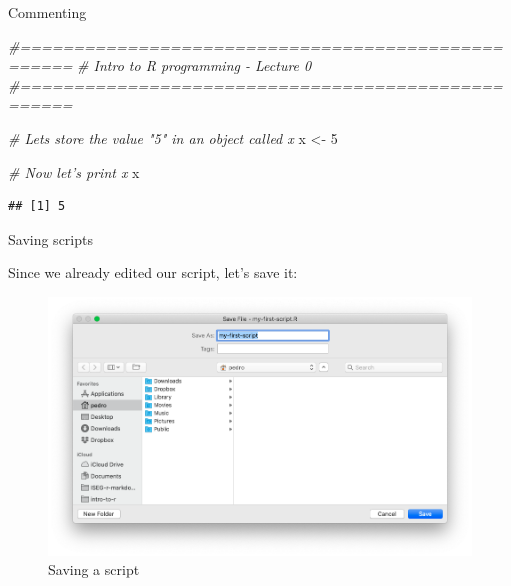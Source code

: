 \documentclass[ignorenonframetext,]{beamer}
\newenvironment{Shaded}{\begin{snugshade}}{\end{snugshade}}
\newcommand{\CommentTok}[1]{\textcolor[rgb]{0.56,0.35,0.01}{\textit{#1}}}
\newcommand{\DecValTok}[1]{\textcolor[rgb]{0.00,0.00,0.81}{#1}}
\newcommand{\NormalTok}[1]{#1}
\newcommand{\StringTok}[1]{\textcolor[rgb]{0.31,0.60,0.02}{#1}}
\begin{document}
\begin{frame}[fragile]{Commenting}
\protect\hypertarget{commenting-1}{}

\begin{Shaded}
\begin{Highlighting}[]
\CommentTok{#===================================================}
\CommentTok{# Intro to R programming - Lecture 0}
\CommentTok{#===================================================}

\CommentTok{# Lets store the value "5" in an object called x}
\NormalTok{x <-}\StringTok{ }\DecValTok{5} 

\CommentTok{# Now let's print x}
\NormalTok{x}
\end{Highlighting}
\end{Shaded}

\begin{verbatim}
## [1] 5
\end{verbatim}

\end{frame}

\begin{frame}{Saving scripts}
\protect\hypertarget{saving-scripts}{}

Since we already edited our script, let's save it:

\begin{figure}
\includegraphics[scale=0.32]{figures/save}
\caption{Saving a script}
\end{figure}

\end{frame}
\end{document}
